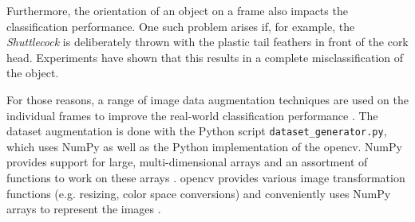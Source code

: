 Furthermore, the orientation of an object on a frame also impacts the classification performance.
One such problem arises if, for example, the \textit{Shuttlecock} is deliberately thrown with the plastic tail feathers in front of the cork head.
Experiments have shown that this results in a complete misclassification of the object.

For those reasons, a range of image data augmentation techniques are used on the individual frames to improve the real-world classification performance \cite{}. %
The dataset augmentation is done with the Python script \texttt{dataset\_generator.py}, which uses NumPy as well as the Python implementation of the \acrfull{opencv}.
NumPy provides support for large, multi-dimensional arrays and an assortment of functions to work on these arrays \cite{}. %
\acrshort{opencv} provides various image transformation functions (e.g. resizing, color space conversions) and conveniently uses NumPy arrays to represent the images \cite{}. %

